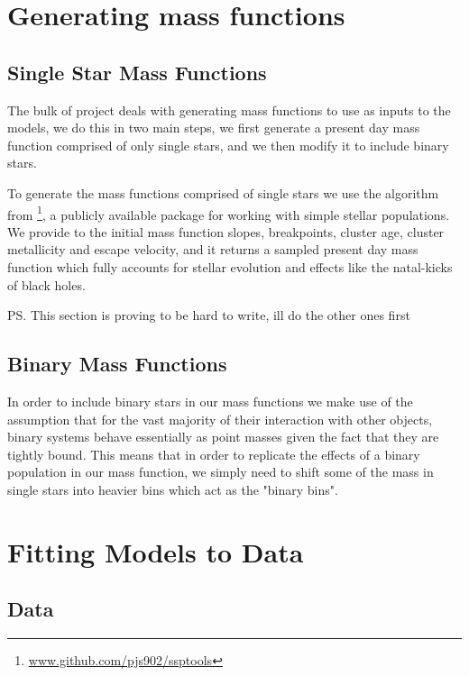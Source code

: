 \newcommand{\evolvemf}{\code{evolve\_mf }}

\section{Generating mass functions}

\subsection{Single Star Mass Functions}
The bulk of project deals with generating mass functions to use as inputs to the 
models, we do this in two main steps, we first generate a present day mass function comprised of
only single stars, and we then modify it to include binary stars.

To generate the mass functions comprised of single stars we use the \evolvemf algorithm from
\footnote{\url{www.github.com/pjs902/ssptools}}, a publicly available package for
working with simple stellar populations. We provide to \evolvemf the initial mass function slopes,
breakpoints, cluster age, cluster metallicity and escape velocity, and it returns a sampled present
day mass function which fully accounts for stellar evolution and effects like the natal-kicks of black
holes.

\ps{This section is proving to be hard to write, ill do the other ones first}

\subsection{Binary Mass Functions}

In order to include binary stars in our mass functions we make use of the assumption that for the
vast majority of their interaction with other objects, binary systems behave essentially as point
masses given the fact that they are tightly bound. This means that in order to replicate the effects
of a binary population in our mass function, we simply need to shift some of the mass in single
stars into heavier bins which act as the "binary bins".

\section{Fitting Models to Data}

\subsection{Data}

